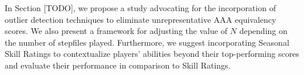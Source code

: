 \vspace{2mm}

In Section [TODO], we propose a study advocating for the incorporation of outlier detection techniques to eliminate unrepresentative AAA equivalency scores. We also present a framework for adjusting the value of $N$ depending on the number of stepfiles played. Furthermore, we suggest incorporating Seasonal Skill Ratings to contextualize players' abilities beyond their top-performing scores and evaluate their performance in comparison to Skill Ratings.
